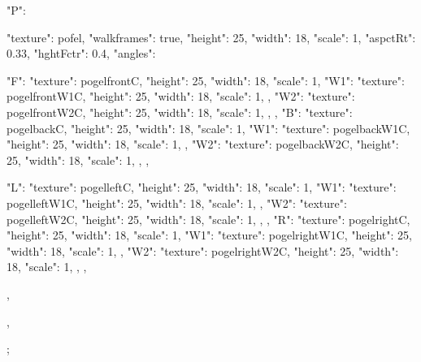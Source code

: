 {  "P": {
    "texture": pofel,
    "walkframes": true,
    "height": 25,
    "width": 18,
    "scale": 1,
    "aspctRt": 0.33,
    "hghtFctr": 0.4,
    "angles":{
      "F": {
        "texture": pogelfrontC,
        "height": 25,
        "width": 18,
        "scale": 1,
        "W1": {
          "texture": pogelfrontW1C,
          "height": 25,
          "width": 18,
          "scale": 1,
        },
        "W2": {
          "texture": pogelfrontW2C,
          "height": 25,
          "width": 18,
          "scale": 1,
        },
      },
      "B": {
        "texture": pogelbackC,
        "height": 25,
        "width": 18,
        "scale": 1,
        "W1": {
          "texture": pogelbackW1C,
          "height": 25,
          "width": 18,
          "scale": 1,
        },
        "W2": {
          "texture": pogelbackW2C,
          "height": 25,
          "width": 18,
          "scale": 1,
        },
      },

      "L": {
        "texture": pogelleftC,
        "height": 25,
        "width": 18,
        "scale": 1,
        "W1": {
          "texture": pogelleftW1C,
          "height": 25,
          "width": 18,
          "scale": 1,
        },
        "W2": {
          "texture": pogelleftW2C,
          "height": 25,
          "width": 18,
          "scale": 1,
        },
      },
      "R": {
        "texture": pogelrightC,
        "height": 25,
        "width": 18,
        "scale": 1,
        "W1": {
          "texture": pogelrightW1C,
          "height": 25,
          "width": 18,
          "scale": 1,
        },
        "W2": {
          "texture": pogelrightW2C,
          "height": 25,
          "width": 18,
          "scale": 1,
        },
      },
    },
  },
};